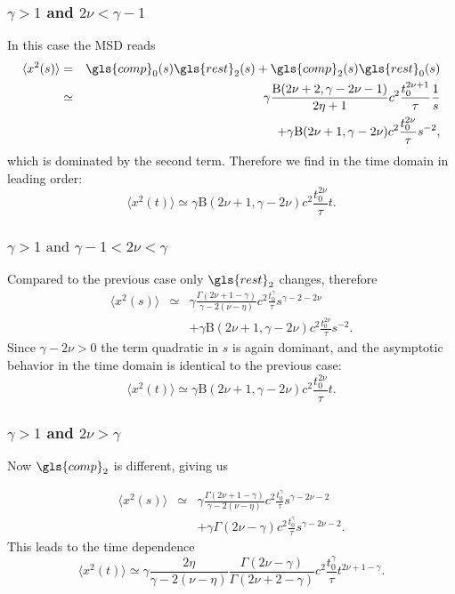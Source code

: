 \subsubsection{$\gamma>1$ and $2\nu < \gamma-1$}
In this case the MSD reads
\begin{eqnarray}
\langle x^2(s) \rangle &=& \gls{comp}_0(s) \gls{rest}_2(s) + \gls{comp}_2(s)  \gls{rest}_0(s) \nonumber \\
& \simeq & \gamma \frac{\mathrm{B}(2\nu +2, \gamma - 2\nu -1)}{2\eta+1} c^2 \frac{t_0^{2\nu+1}}{\tau}\frac{1} {s}    \\
& & + \gamma \mathrm{B}(2\nu+1,\gamma-2\nu) c^2 \frac{t_0^{2\nu}}{\tau}  s^{-2} \nonumber ,
\end{eqnarray}
which is dominated by the second term. Therefore we find in the time domain in leading order:
\begin{equation}
\langle x^2(t) \rangle \simeq \gamma \mathrm{B}(2\nu+1,\gamma-2\nu) c^2 \frac{ t_0^{2\nu}}{\tau}  t.
\end{equation}

\subsubsection{$\gamma>1 \text{ and }  \gamma-1 <2\nu < \gamma$}
Compared to the previous case only $\gls{rest}_2$ changes, therefore
\begin{eqnarray}
\langle x^2(s) \rangle &\simeq & \gamma \frac{\Gamma(2\nu+1-\gamma)}{\gamma - 2(\nu-\eta)} c^2\frac{t_0^{\gamma}}{\tau}  s^{\gamma-2-2\nu} \nonumber \\
&& + \gamma \mathrm{B}(2\nu+1,\gamma-2\nu) c^2\frac{t_0^{2\nu}}{\tau}  s^{-2} .
\end{eqnarray}
Since $\gamma-2\nu>0$ the term quadratic in $s$ is again dominant, and the asymptotic behavior in the time domain is identical to the previous case:
\begin{equation}
\langle x^2(t) \rangle \simeq   \gamma \mathrm{B}(2\nu+1,\gamma-2\nu) c^2
\frac{t_0^{2\nu}}{\tau}  t.
\end{equation}

\subsubsection{$\gamma>1$ and $2\nu > \gamma$}
Now $\gls{comp}_2$ is different, giving us 

\begin{eqnarray}
\langle x^2(s) \rangle &\simeq & \gamma \frac{\Gamma(2\nu+1-\gamma)}{\gamma - 2(\nu-\eta)} c^2 \frac{t_0^{\gamma}}{\tau}  s^{\gamma-2\nu-2} \nonumber\\
& & + \gamma \Gamma(2\nu-\gamma) c^2\frac {t_0^{\gamma}}{\tau}  s^{\gamma-2\nu-2}. 
\end{eqnarray}
This leads to the time dependence 
\begin{equation}
\langle x^2(t) \rangle \simeq \gamma   \frac{2 \eta }{\gamma - 2(\nu-\eta) } \frac{\Gamma(2\nu-\gamma)}{\Gamma(2\nu + 2-\gamma)} c^2  \frac{t_0^{\gamma}}{\tau } t^{2\nu+1-\gamma}.
\end{equation}

